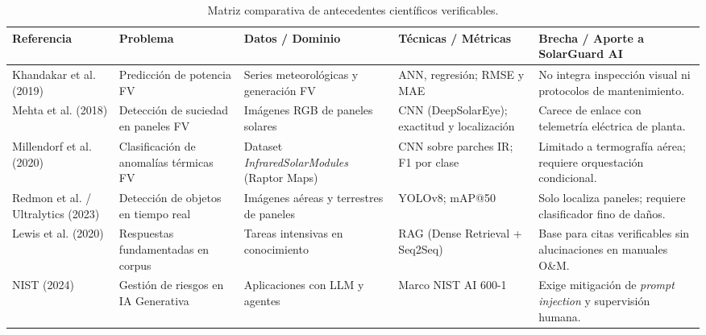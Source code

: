 \documentclass[12pt,a4paper]{article}
\begin{document}
\begin{table}[H]
\centering
\caption{Matriz comparativa de antecedentes científicos verificables.}
\label{tab:antecedentes}
\scriptsize
\begin{tabular}{p{2.5cm}p{2.3cm}p{2.8cm}p{2.5cm}p{3.6cm}}
\toprule
\textbf{Referencia} & \textbf{Problema} & \textbf{Datos / Dominio} & \textbf{Técnicas / Métricas} & \textbf{Brecha / Aporte a SolarGuard AI} \\
\midrule
Khandakar et al. (2019) & Predicción de potencia FV & Series meteorológicas y generación FV & ANN, regresión; RMSE y MAE & No integra inspección visual ni protocolos de mantenimiento. \\
Mehta et al. (2018) & Detección de suciedad en paneles FV & Imágenes RGB de paneles solares & CNN (DeepSolarEye); exactitud y localización & Carece de enlace con telemetría eléctrica de planta. \\
Millendorf et al. (2020) & Clasificación de anomalías térmicas FV & Dataset \textit{InfraredSolarModules} (Raptor Maps) & CNN sobre parches IR; F1 por clase & Limitado a termografía aérea; requiere orquestación condicional. \\
Redmon et al. / Ultralytics (2023) & Detección de objetos en tiempo real & Imágenes aéreas y terrestres de paneles & YOLOv8; mAP@50 & Solo localiza paneles; requiere clasificador fino de daños. \\
Lewis et al. (2020) & Respuestas fundamentadas en corpus & Tareas intensivas en conocimiento & RAG (Dense Retrieval + Seq2Seq) & Base para citas verificables sin alucinaciones en manuales O\&M. \\
NIST (2024) & Gestión de riesgos en IA Generativa & Aplicaciones con LLM y agentes & Marco NIST AI 600-1 & Exige mitigación de \textit{prompt injection} y supervisión humana. \\
\bottomrule
\end{tabular}
\end{table}
\end{document}
